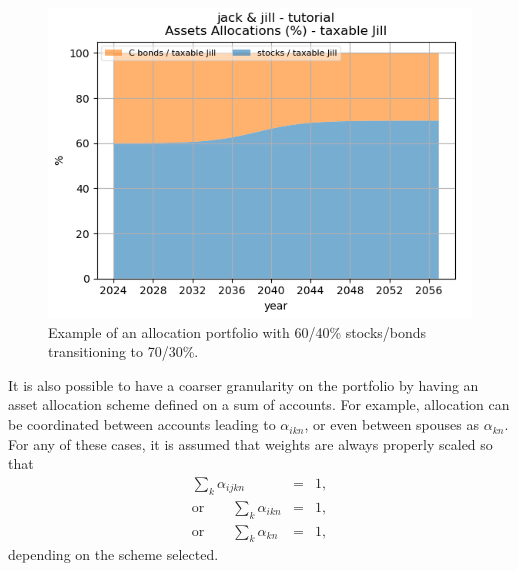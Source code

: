 \documentclass{report}[fleqn,12pt]
\begin{document}
\begin{description}[leftmargin=4em,style=multiline]
	\begin{figure}[t]
	\includegraphics{allocations.png}
		\caption{\small Example of an allocation portfolio with 60/40\% stocks/bonds 
		transitioning to 70/30\%. \label{Fig:allocations}}
	\end{figure}
	It is also possible to have a coarser granularity on the portfolio by
	having an asset allocation scheme
	defined on a sum of accounts. For example, allocation can be coordinated between accounts
	leading to $\alpha_{ikn}$, or even between spouses as $\alpha_{kn}$.
	For any of these cases, it is assumed that weights are always properly scaled so that
	\begin{eqnarray}
		\sum_{k} \alpha_{ijkn} &=& 1, \nonumber\\
		\text{or} \qquad \sum_{k} \alpha_{ikn} &=& 1, \nonumber\\
		\text{or} \qquad \sum_{k} \alpha_{kn} &=& 1,
	\end{eqnarray}
	depending on the scheme selected.


\end{description}
\end{document}

